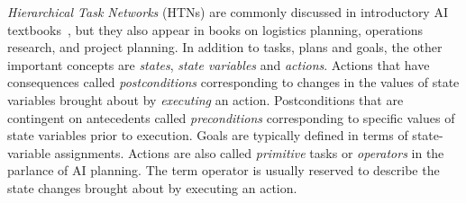 \documentclass[letterpaper,12pt]{article}
\begin{document}
{\it{Hierarchical Task Networks}} (HTNs) are commonly discussed in introductory AI textbooks~\cite{RussellandNorvig03,Deanetal95}, but they also appear in books on logistics planning, operations research, and project planning. In addition to tasks, plans and goals, the other important concepts are {\it{states}}, {\it{state variables}} and {\it{actions}}. Actions that have consequences called {\it{postconditions}} corresponding to changes in the values of state variables brought about by {\it{executing}} an action. Postconditions that are contingent on antecedents called {\it{preconditions}} corresponding to specific values of state variables prior to execution. Goals are typically defined in terms of state-variable assignments. Actions are also called {\it{primitive}} tasks or {\it{operators}} in the parlance of AI planning. The term operator is usually reserved to describe the state changes brought about by executing an action. 
\end{document}
